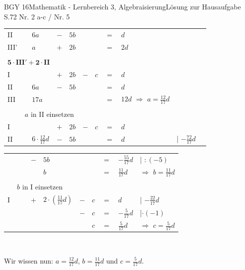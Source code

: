 \documentclass[oneside,openany,headings=optiontotoc,11pt,numbers=noenddot]{scrreprt}
\begin{document}
\begin{worksheet}{BGY 16}{Mathematik - Lernbereich 3, Algebraisierung}{Lösung zur Hausaufgabe S.72 Nr. 2 a-c / Nr. 5}
\begin{framed}
\begin{tabularx}{\textwidth}{lllllllllll}
				II & \(\) & \(6a\) & \(-\) & \(5b\) & \(\) & \(\) & \(=\) & \(d\)\\
				III' & \(\) & \(a\) & \(+\) & \(2b\) & \(\) & \(\) & \(=\) & \(2d\)\\
				\cline{1-9}\\
				\multicolumn{3}{c}{\(\mathbf{5\cdot III' + 2\cdot II}\)}\\
				I & \(\) & \(\) & \(+\) & \(2b\) & \(-\) & \(c\) & \(=\) & \(d\)\\
				II & \(\) & \(6a\) & \(-\) & \(5b\) & \(\) & \(\) & \(=\) & \(d\)\\
				III & \(\) & \(17a\) & \(\) & \(\) & \(\) & \(\) & \(=\) & \(12d\) \(\Rightarrow\) \colorbox{green!10}{\(a = \frac{12}{17}d\)}\\
				\cline{1-9}\\
				& \multicolumn{9}{l}{\(a\) in II einsetzen}\\
				I & \(\) & \(\) & \(+\) & \(2b\) & \(-\) & \(c\) & \(=\) & \(d\)\\
				II & \(\) & \(6\cdot \frac{12}{17}d\) & \(-\) & \(5b\) & \(\) & \(\) & \(=\) & \(d\)& | \(-\frac{72}{17}d\)\\
			\end{tabularx}
			\begin{tabularx}{\textwidth}{llllllllll}
				& \(\) & \(\) & \(-\) & \(5b\) & \(\) & \(\) & \(=\) & \(-\frac{55}{17}d\)& | \(:(-5)\)\\
				& \(\) & \(\) & \(\) & \(b\) & \(\) & \(\) & \(=\) & \(\frac{11}{17}d\) & \(\Rightarrow\) \colorbox{green!10}{\(b = \frac{11}{17}d\)}\\
				\cline{1-9}\\
				& \multicolumn{9}{l}{\(b\) in I einsetzen}\\
				I & \(\) & \(\) & \(+\) & \(2\cdot\left(\frac{11}{17}d\right)\) & \(-\) & \(c\) & \(=\) & \(d\) & | \(-\frac{22}{17}d\)\\
				& \(\) & \(\) & \(\) & \(\) & \(-\) & \(c\) & \(=\) & \(-\frac{5}{17}d\) & |\(\cdot(-1)\)\\
				& \(\) & \(\) & \(\) & \(\) & \(\) & \(c\) & \(=\) & \(\frac{5}{17}d\) & \(\Rightarrow\) \colorbox{green!10}{\(c = \frac{5}{17}d\)}\\
			\end{tabularx}\\
			\par\bigskip\noindent
			Wir wissen nun: \colorbox{green!10}{\(a = \frac{12}{17}d\)}, \colorbox{green!10}{\(b = \frac{11}{17}d\)} und \colorbox{green!10}{\(c = \frac{5}{17}d\)}.\\

\end{framed}
\end{worksheet}
\end{document}
